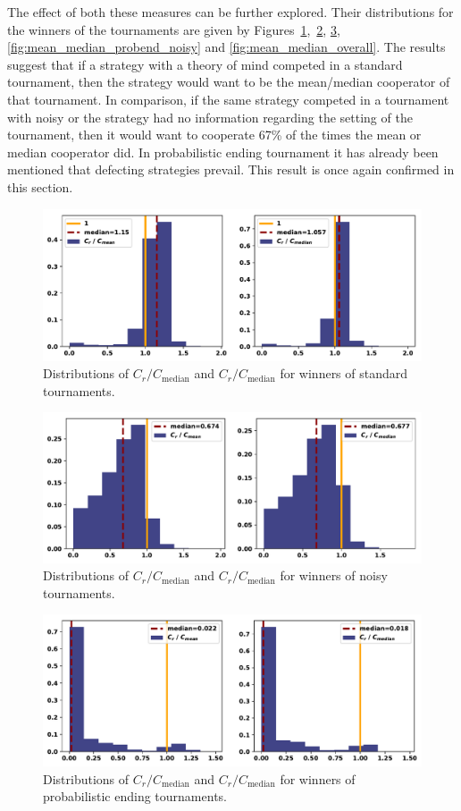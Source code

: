 \documentclass{article}
\begin{document}
The effect of both these measures can be further explored. Their distributions
for the winners of the tournaments are given by
Figures~\ref{fig:mean_median_std},~\ref{fig:mean_median_noisy},
\ref{fig:mean_median_probend}, \ref{fig:mean_median_probend_noisy} and
\ref{fig:mean_median_overall}. The results suggest that if a strategy with
a theory of mind competed in a standard tournament, then the strategy would
want to be the mean/median cooperator of that tournament. In comparison, if the
same strategy competed in a tournament with noisy or the strategy had no
information regarding the setting of the tournament, then it would
want to cooperate 67\% of the times the mean or median cooperator did.
In probabilistic ending tournament it has already been mentioned that defecting
strategies prevail. This result is once again confirmed in this section.

\begin{figure}[!htbp]
    \centering
    \includegraphics[width=.5\textwidth]{../images/compared_to_mean_median_standard.pdf}
    \caption{Distributions of \(C_r / C_{\text{median}}\)
    and \(C_r / C_{\text{median}}\) for winners of standard tournaments.}\label{fig:mean_median_std}
\end{figure}

\begin{figure}[!htbp]
    \centering
    \includegraphics[width=.5\textwidth]{../images/compared_to_mean_median_noisy.pdf}
    \caption{Distributions of \(C_r / C_{\text{median}}\)
    and \(C_r / C_{\text{median}}\) for winners of noisy tournaments.}\label{fig:mean_median_noisy}
\end{figure}

\begin{figure}[!htbp]
    \centering
    \includegraphics[width=.5\textwidth]{../images/compared_to_mean_median_probend.pdf}
    \caption{Distributions of \(C_r / C_{\text{median}}\)
    and \(C_r / C_{\text{median}}\) for winners of probabilistic ending tournaments.}\label{fig:mean_median_probend}
\end{figure}
\end{document}
